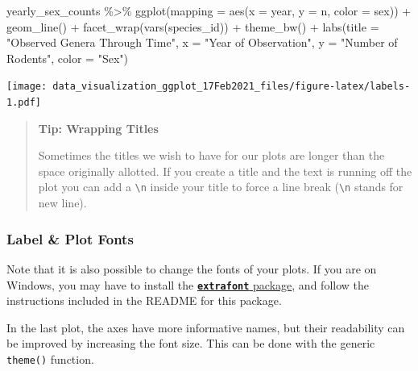 \documentclass[
]{article}
\newenvironment{Shaded}{\begin{snugshade}}{\end{snugshade}}
\newcommand{\AttributeTok}[1]{\textcolor[rgb]{0.77,0.63,0.00}{#1}}
\newcommand{\FunctionTok}[1]{\textcolor[rgb]{0.00,0.00,0.00}{#1}}
\newcommand{\NormalTok}[1]{#1}
\newcommand{\SpecialCharTok}[1]{\textcolor[rgb]{0.00,0.00,0.00}{#1}}
\newcommand{\StringTok}[1]{\textcolor[rgb]{0.31,0.60,0.02}{#1}}
\begin{document}
\begin{Shaded}
\begin{Highlighting}[]
\NormalTok{yearly\_sex\_counts }\SpecialCharTok{\%\textgreater{}\%} 
  \FunctionTok{ggplot}\NormalTok{(}\AttributeTok{mapping =} \FunctionTok{aes}\NormalTok{(}\AttributeTok{x =}\NormalTok{ year, }\AttributeTok{y =}\NormalTok{ n, }\AttributeTok{color =}\NormalTok{ sex)) }\SpecialCharTok{+}
  \FunctionTok{geom\_line}\NormalTok{() }\SpecialCharTok{+}
  \FunctionTok{facet\_wrap}\NormalTok{(}\FunctionTok{vars}\NormalTok{(species\_id)) }\SpecialCharTok{+}
  \FunctionTok{theme\_bw}\NormalTok{() }\SpecialCharTok{+}
  \FunctionTok{labs}\NormalTok{(}\AttributeTok{title =} \StringTok{"Observed Genera Through Time"}\NormalTok{,}
       \AttributeTok{x =} \StringTok{"Year of Observation"}\NormalTok{,}
       \AttributeTok{y =} \StringTok{"Number of Rodents"}\NormalTok{,  }
       \AttributeTok{color =} \StringTok{"Sex"}\NormalTok{) }
\end{Highlighting}
\end{Shaded}

\texttt{[image: data\_visualization\_ggplot\_17Feb2021\_files/figure-latex/labels-1.pdf]}

\begin{quote}
\textbf{Tip: Wrapping Titles}

Sometimes the titles we wish to have for our plots are longer than the
space originally allotted. If you create a title and the text is running
off the plot you can add a \texttt{\textbackslash{}n} inside your title
to force a line break (\texttt{\textbackslash{}n} stands for new line).
\end{quote}

\hypertarget{label-plot-fonts}{%
\subsubsection{Label \& Plot Fonts}\label{label-plot-fonts}}

Note that it is also possible to change the fonts of your plots. If you
are on Windows, you may have to install the
\href{https://github.com/wch/extrafont}{\textbf{\texttt{extrafont}}
package}, and follow the instructions included in the README for this
package.

In the last plot, the axes have more informative names, but their
readability can be improved by increasing the font size. This can be
done with the generic \texttt{theme()} function.
\end{document}

